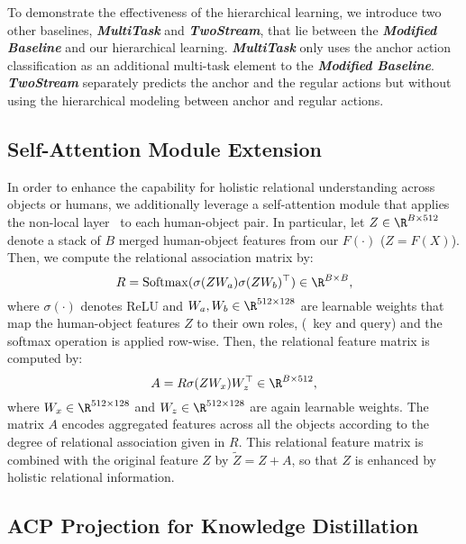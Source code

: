 To demonstrate the effectiveness of the hierarchical learning, we introduce two other baselines,  \emph{\textbf{MultiTask}} and \emph{\textbf{TwoStream}}, that lie between the \emph{\textbf{Modified Baseline}} and our hierarchical learning. \emph{\textbf{MultiTask}} only uses the anchor action classification as an additional multi-task element to the \emph{\textbf{Modified Baseline}}. \emph{\textbf{TwoStream}} separately predicts the anchor and the regular actions
but without using the hierarchical modeling between anchor and regular actions. 







\subsection{Self-Attention Module Extension}
\label{sec.attention}
In order to enhance the capability for holistic relational understanding across objects or humans, we additionally leverage a self-attention module that applies the non-local layer~\cite{wang2018non} to each human-object pair. In particular, let $Z \in \R^{B\times 512}$ denote a stack of $B$ merged human-object features from our $F(\cdot)$ ($Z=F(X)$).
Then, we compute the relational association matrix by:
\begin{equation}
        R = \mathrm{Softmax}({\sigma}(Z W_a){\sigma}(Z W_b)^\top) \in \R^{B\times B},
		\label{eq:REM1}
\end{equation}
where {$\sigma(\cdot)$ denotes ReLU and} $W_a, W_b \in \R^{512\times 128}$ are learnable {weights} that map the human-object features $Z$ to their own roles, (\eg~key and query) and 
the softmax operation is applied row-wise.
Then, the relational feature matrix is computed by:
\begin{equation}
A = R\sigma(ZW_x)W_z^\top \in \R^{B\times 512},
\label{eq:REM2}
\end{equation}
where $W_x\in \R^{512\times 128}$ and $W_z\in \R^{512\times 128}$ are again learnable {weights}.
The matrix $A$ encodes aggregated features across all the objects according to the degree of relational association given in $R$. This relational feature matrix is combined with the original feature $Z$ by $\tilde{Z} = Z + A$, so that $Z$ is enhanced by holistic relational information.








\subsection{{ACP Projection for Knowledge Distillation}}
\label{sec.knowledge_distillation}

